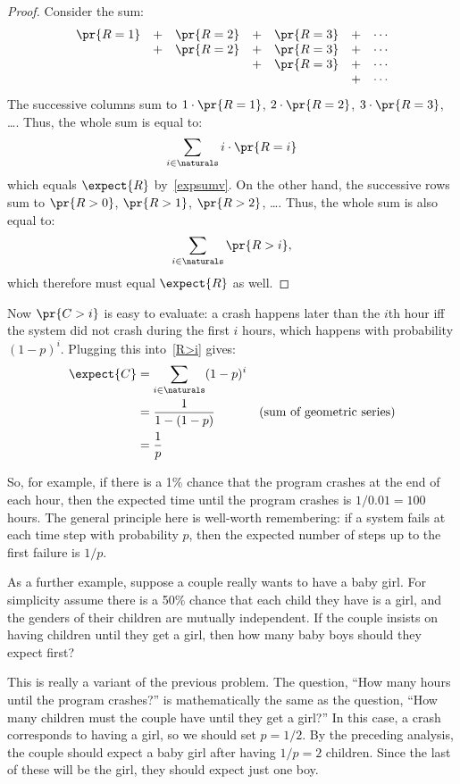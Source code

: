 \begin{proof}
Consider the sum:
%
\[
\begin{array}{ccccccc}
\pr{R = 1} & + & \pr{R = 2} & + & \pr{R = 3} & + & \cdots \\
           & + & \pr{R = 2} & + & \pr{R = 3} & + & \cdots \\
           &   &            & + & \pr{R = 3} & + & \cdots \\
           &   &            &   &            & + & \cdots
\end{array}
\]
%
The successive columns sum to $1 \cdot \pr{R = 1}$, $2 \cdot \pr{R = 2}$,
$3 \cdot \pr{R = 3}$, \dots.  Thus, the whole sum is equal to:
%
\[
\sum_{i \in \naturals} i \cdot \pr{R = i}
\]
which equals $\expect{R}$ by~\eqref{expsumv}.  On the other hand, the
successive rows sum to $\pr{R > 0}$, $\pr{R > 1}$, $\pr{R > 2}$, \dots.
Thus, the whole sum is also equal to:
%
\[
\sum_{i \in \naturals} \pr{R > i},
\]
%
which therefore must equal $\expect{R}$ as well.
\end{proof}

Now $\pr{C > i}$ is easy to evaluate: a crash happens later than the $i$th
hour iff the system did not crash during the first $i$ hours, which
happens with probability $(1-p)^i$.  Plugging this into~\eqref{R>i} gives:
%
\begin{align*}
\expect{C} & = \sum_{i \in \naturals} (1-p)^i \\
       & = \frac{1}{1 - (1-p)} & \text{(sum of geometric series)}\\
       & = \frac{1}{p}
\end{align*}

So, for example, if there is a 1\% chance that the program crashes at
the end of each hour, then the expected time until the program crashes
is $1 / 0.01 = 100$ hours.  The general principle here is well-worth
remembering: if a system fails at each time step with probability $p$,
then the expected number of steps up to the first failure is $1 / p$.


As a further example, suppose a couple really wants to have a baby girl.
For simplicity assume there is a 50\% chance that each child they have is a
girl, and the genders of their children are mutually independent.  If the
couple insists on having children until they get a girl, then how many
baby boys should they expect first?

This is really a variant of the previous problem.  The question, ``How
many hours until the program crashes?'' is mathematically the same as
the question, ``How many children must the couple have until they get
a girl?''  In this case, a crash corresponds to having a girl, so we
should set $p = 1/2$.  By the preceding analysis, the couple
should expect a baby girl after having $1/p = 2$ children.  Since the
last of these will be the girl, they should expect just one boy.

